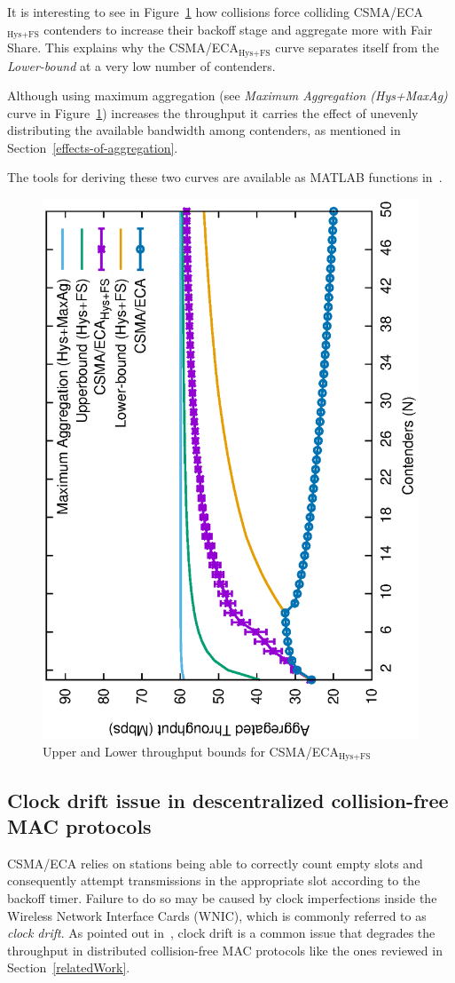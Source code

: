 	It is interesting to see in Figure~\ref{fig:ECA-bounds-comparison} how collisions force colliding CSMA/ECA$_{\text{Hys+FS}}$ contenders to increase their backoff stage and aggregate more with Fair Share. This explains why the CSMA/ECA$_{\text{Hys+FS}}$ curve separates itself from the \emph{Lower-bound} at a very low number of contenders. 
	
	Although using maximum aggregation (see \emph{Maximum Aggregation (Hys+MaxAg)} curve in Figure~\ref{fig:ECA-bounds-comparison}) increases the throughput it carries the effect of unevenly distributing the available bandwidth among contenders, as mentioned in Section~\ref{effects-of-aggregation}.
	
	The tools for deriving these two curves are available as MATLAB functions in~\cite{ECA-bounds-example}. 
	
	\begin{figure}[tb]
	\centering
		\includegraphics[width=0.7\linewidth,angle=-90]{figures/throughput-w-model/throughput-combined-w-model-TON.eps}
		\caption{Upper and Lower throughput bounds for CSMA/ECA$_{\text{Hys+FS}}$}
		\label{fig:ECA-bounds-comparison}
	\end{figure}
	
	\subsection{Clock drift issue in descentralized collision-free MAC protocols}\label{clockDrift-issue}
	CSMA/ECA relies on stations being able to correctly count empty slots and consequently attempt transmissions in the appropriate slot according to the backoff timer. Failure to do so may be caused by clock imperfections inside the Wireless Network Interface Cards (WNIC), which is commonly referred to as \emph{clock drift}. As pointed out in~\cite{slotDrift}, clock drift is a common issue that degrades the throughput in distributed collision-free MAC protocols like the ones reviewed in Section~\ref{relatedWork}.
	
